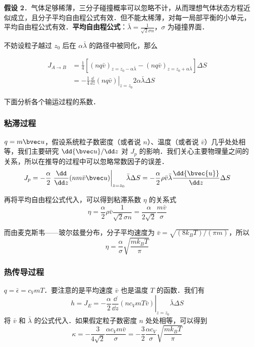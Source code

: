 \textbf{假设 2}．气体足够稀薄，三分子碰撞概率可以忽略不计，从而理想气体状态方程近似成立，且分子平均自由程公式有效．但不能太稀薄，对每一局部平衡的小单元，平均自由程公式有效．\textbf{平均自由程公式}：$\bar \lambda = \frac{1}{\sqrt{2} \sigma n}$，$\sigma$ 为碰撞界面．

不妨设粒子越过 $z_0$ 后在 $\alpha \bar \lambda$ 的路径中被同化，那么

\begin{align}
J_{A\rightarrow B} &=\frac{1}{4}[(nq\bar v)_{z=z_0-\alpha \bar \lambda}-(nq\bar v)_{z=z_0+\alpha \bar \lambda}]\Delta S\\
&=-\frac{1}{4}\left.\frac{\dd}{\dd z}(nq\bar v)\right|_{z=z_0} 2\alpha\bar \lambda \Delta S
\end{align}

下面分析各个输运过程的系数．

\subsubsection{粘滞过程}
$q=m\bvec u$，假设系统粒子数密度（或者说 $n$）、温度（或者说 $\bar v$）几乎处处相等，我们主要研究 $\dd{\bvec u}/\dd z$ 对 $J_p$ 的影响．我们关心主要物理量之间的关系，所以在推导的过程中可以忽略常数因子的误差．
\begin{equation}
J_p=-\frac{\alpha}{2}\left.\frac{\dd}{\dd z}(nm\bar v \bvec u)\right|_{z=z_0}\bar \lambda \Delta S
=-\frac{\alpha}{2}\rho\bar v \bar \lambda \frac{\dd{\bvec{u}}}{\dd z}\Delta S
\end{equation}

再将平均自由程公式代入，可以得到粘滞系数 $\eta$ 的关系式
\begin{equation}
\eta = \frac{\alpha}{2}\rho\bar v \frac{1}{\sqrt{2}\sigma n}=\frac{\alpha}{2\sqrt{2}}\frac{m \bar v}{\sigma}
\end{equation}

而由麦克斯韦——玻尔兹曼分布，分子平均速度为 $\bar v=\sqrt{(8k_BT)/(\pi m)}$，所以
\begin{equation}
\eta = \frac{\alpha}{\sigma}\sqrt{\frac{mk_BT}{\pi}}
\end{equation}

\subsubsection{热传导过程}
$q=\bar \epsilon = c_VmT$．要注意的是平均速度 $\bar v$ 也是温度 $T$ 的函数．我们有
\begin{equation}
h=J_E=-\frac{\alpha}{2}\left.\frac{\dd }{\dd z}(nc_VmT\bar v)\right|_{z=z_0} \bar\lambda \Delta S
\end{equation}
将 $\bar v$ 和 $\bar\lambda$ 的公式代入．如果假定粒子数密度 $n$ 处处相等，可以得到
\begin{equation}
\kappa=-\frac{3}{4\sqrt{2}}\frac{\alpha c_Vm\bar v}{\sigma}=-\frac{3}{2}\frac{\alpha c_V}{\sigma}\sqrt{\frac{mk_BT}{\pi}}
\end{equation}

